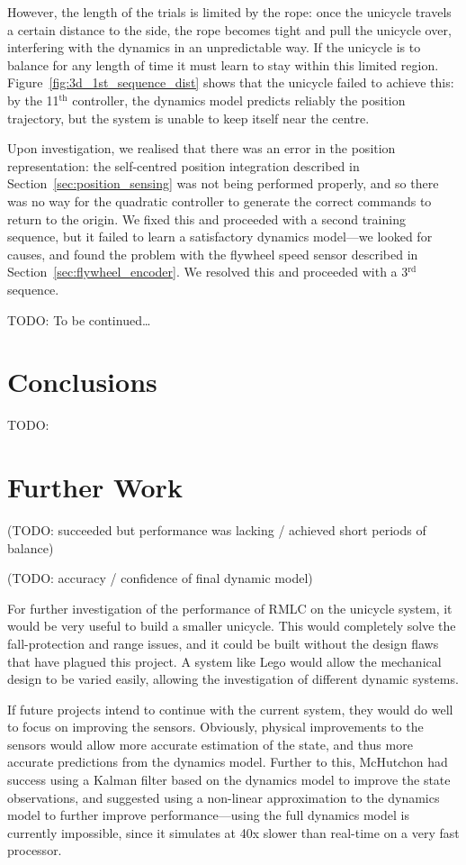 \documentclass{IIBproject}
\begin{document}
However, the length of the trials is limited by the rope: once the unicycle
travels a certain distance to the side, the rope becomes tight and pull the
unicycle over, interfering with the dynamics in an unpredictable way. If the
unicycle is to balance for any length of time it must learn to stay within
this limited region. Figure~\ref{fig:3d_1st_sequence_dist} shows that the
unicycle failed to achieve this: by the 11$^\textrm{th}$ controller, the
dynamics model predicts reliably the position trajectory, but the system is
unable to keep itself near the centre.

Upon investigation, we realised that there was an error in the position
representation: the self-centred position integration described in
Section~\ref{sec:position_sensing} was not being performed properly, and so
there was no way for the quadratic controller to generate the correct commands
to return to the origin. We fixed this and proceeded with a second training
sequence, but it failed to learn a satisfactory dynamics model---we looked for
causes, and found the problem with the flywheel speed sensor described in
Section~\ref{sec:flywheel_encoder}. We resolved this and proceeded with a
3$^\textrm{rd}$ sequence.

TODO: To be continued\dots

\section{Conclusions}

TODO: 

\section{Further Work}

(TODO: succeeded but performance was lacking / achieved short periods of balance)

(TODO: accuracy / confidence of final dynamic model)

For further investigation of the performance of RMLC on the unicycle system,
it would be very useful to build a smaller unicycle. This would completely
solve the fall-protection and range issues, and it could be built without the
design flaws that have plagued this project. A system like Lego would allow
the mechanical design to be varied easily, allowing the investigation of
different dynamic systems.

If future projects intend to continue with the current system, they would do
well to focus on improving the sensors. Obviously, physical improvements to
the sensors would allow more accurate estimation of the state, and thus more
accurate predictions from the dynamics model. Further to this, McHutchon had
success using a Kalman filter based on the dynamics model to improve the state
observations, and suggested using a non-linear approximation to the dynamics
model to further improve performance---using the full dynamics model is
currently impossible, since it simulates at 40x slower than real-time on a
very fast processor.
\end{document}
